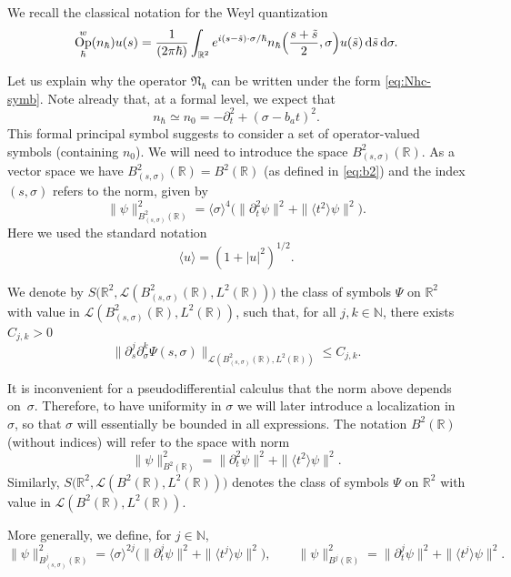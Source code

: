 \documentclass[JEP,XML,SOM,Unicode,NoFloatCountersInSection,published]{cedram}
\newcommand{\rd}{\,\mathrm{d}}
\DeclareMathOperator{\Op}{Op}
\theoremstyle{plain}
\theoremstyle{definition}
\newcommand{\R}{\mathbb{R}}
\begin{document}
We recall the classical notation for the Weyl quantization
\begin{equation}\label{eq:Nhc-symb}
\Op^w_\hbar (n_{\hbar}) u (s)=\frac{1}{(2\pi\hbar)} \int_{\mathbb R^2} e^{i(s-\tilde s)\cdot \sigma/\hbar} n_{\hbar} \Bigl(\frac{s+\tilde s}{2}, \sigma\Bigr)u(\tilde s) \rd \tilde s \rd \sigma.
\end{equation}

Let us explain why the operator $\mathfrak{N}_\hbar$ can be written under the form \eqref{eq:Nhc-symb}. Note already that, at a formal level, we expect that
\[
n_{\hbar}\simeq n_0=-\partial^2_t+(\sigma-b_a t)^2.
\]
This formal principal symbol suggests to consider a set of operator-valued symbols (containing $n_0$).
We will need to introduce the space $B_{(s,\sigma)}^2(\R)$. As a vector space we have $B_{(s,\sigma)}^2(\R) = B^2(\R)$ (as defined in \eqref{eq:b2}) and the index $(s,\sigma)$ refers to the norm, given by
\[
\|\psi\|^2_{B_{(s,\sigma)}^2(\R)}=\langle \sigma\rangle^4 \bigl(\|\partial^2_t\psi\|^2+\|\langle t^2\rangle\psi\|^2\bigr).
\]
Here we used the standard notation
\begin{equation}\label{eq:<u>}
\langle u\rangle=(1+|u|^2)^{1/2}.
\end{equation}

We denote by $S\bigl(\R^2,\mathscr{L}(B_{(s,\sigma)}^2(\R),L^2(\R))\bigr)$ the class of symbols $\Psi$ on $\mathbb R^2$
with value in $\mathscr{L}(B_{(s,\sigma)}^2(\R),L^2(\R))$, such that, for all $j,k \in \mathbb N$, there exists $C_{j,k} >0$
\[
\| \partial_s^j\partial_\sigma^k \Psi (s,\sigma)\|_{\mathscr{L} (B_{(s,\sigma)}^2(\mathbb R),L^2(\mathbb R))}\leq C_{j,k}.
\]

It is inconvenient for a pseudodifferential calculus that the norm above depends on~$\sigma$. Therefore, to have uniformity in $\sigma$ we will later introduce a localization in $\sigma$, so that $\sigma$ will essentially be bounded in all expressions.
The notation $B^2(\R)$ (without indices) will refer to the space with norm
\[
\|\psi\|^2_{B^2(\R)}=\|\partial^2_t\psi\|^2+\|\langle t^2\rangle\psi\|^2 .
\]
Similarly,
$S\bigl(\R^2,\mathscr{L}(B^2(\R),L^2(\R))\bigr)$ denotes the class of symbols $\Psi$ on $\mathbb R^2$
with value in $\mathscr{L}(B^2(\R),L^2(\R))$.

More generally, we define, for $j\in {\mathbb N}$,
\begin{equation}\label{eq:bj}
\|\psi\|^2_{B_{(s,\sigma)}^j(\R)}=\langle \sigma\rangle^{2j} \bigl(\|\partial^j_t\psi\|^2+\|\langle t^j\rangle\psi\|^2\bigr), \qquad
\|\psi\|^2_{B^j(\R)}= \|\partial^j_t\psi\|^2+\|\langle t^j\rangle\psi\|^2.
\end{equation}
\end{document}
